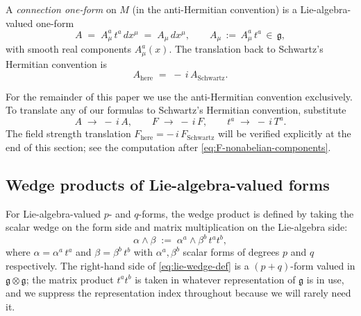 \begin{definition}\label{def:connection-one-form}
A \emph{connection one-form} on $M$ (in the anti-Hermitian convention) is a Lie-algebra-valued one-form
\begin{equation}\label{eq:A-components}
A \;=\; A_\mu^a\, t^a\, dx^\mu \;=\; A_\mu\, dx^\mu, \qquad A_\mu \,:=\, A_\mu^a\, t^a \,\in\, \mathfrak{g},
\end{equation}
with smooth real components $A_\mu^a(x)$. The translation back to Schwartz's Hermitian convention is
\begin{equation}\label{eq:A-schwartz-translation}
A_{\mathrm{here}} \;=\; -\,i\, A_{\mathrm{Schwartz}}.
\end{equation}
\end{definition}

\begin{remark}\label{rem:translation-box}
For the remainder of this paper we use the anti-Hermitian convention exclusively. To translate any of our formulas to Schwartz's Hermitian convention, substitute
\begin{equation*}
A \;\longrightarrow\; -\,i\,A, \qquad F \;\longrightarrow\; -\,i\,F, \qquad t^a \;\longrightarrow\; -\,i\,T^a.
\end{equation*}
The field strength translation $F_{\mathrm{here}} = -\,i\,F_{\mathrm{Schwartz}}$ will be verified explicitly at the end of this section; see the computation after \eqref{eq:F-nonabelian-components}.
\end{remark}

\subsection{Wedge products of Lie-algebra-valued forms}

For Lie-algebra-valued $p$- and $q$-forms, the wedge product is defined by taking the scalar wedge on the form side and matrix multiplication on the Lie-algebra side:
\begin{equation}\label{eq:lie-wedge-def}
\alpha \wedge \beta \;:=\; \alpha^a \wedge \beta^b\, t^a t^b,
\end{equation}
where $\alpha = \alpha^a\, t^a$ and $\beta = \beta^b\, t^b$ with $\alpha^a, \beta^b$ scalar forms of degrees $p$ and $q$ respectively. The right-hand side of \eqref{eq:lie-wedge-def} is a $(p+q)$-form valued in $\mathfrak{g} \otimes \mathfrak{g}$; the matrix product $t^a t^b$ is taken in whatever representation of $\mathfrak{g}$ is in use, and we suppress the representation index throughout because we will rarely need it.

